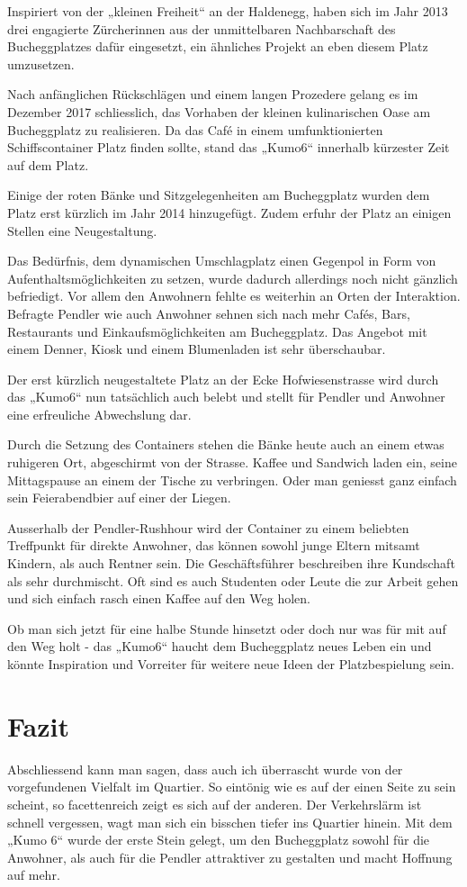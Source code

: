 \documentclass[a4paper,ngerman,11pt]{scrartcl}
\begin{document}
Inspiriert von der „kleinen Freiheit“ an der Haldenegg, haben sich im Jahr 2013
drei engagierte Zürcherinnen aus der unmittelbaren Nachbarschaft des
Bucheggplatzes dafür eingesetzt, ein ähnliches Projekt an eben diesem Platz
umzusetzen.

Nach anfänglichen Rückschlägen und einem langen Prozedere gelang es im Dezember
2017 schliesslich, das Vorhaben der kleinen kulinarischen Oase am Bucheggplatz
zu realisieren. Da das Café in einem umfunktionierten Schiffscontainer Platz
finden sollte, stand das „Kumo6“ innerhalb kürzester Zeit auf dem Platz.

Einige der roten Bänke und Sitzgelegenheiten am Bucheggplatz wurden dem Platz
erst kürzlich im Jahr 2014 hinzugefügt. Zudem erfuhr der Platz an einigen
Stellen eine Neugestaltung.

Das Bedürfnis, dem dynamischen Umschlagplatz einen Gegenpol in Form von
Aufenthaltsmöglichkeiten zu setzen, wurde dadurch allerdings noch nicht gänzlich
befriedigt. Vor allem den Anwohnern fehlte es weiterhin an Orten der
Interaktion. Befragte Pendler wie auch Anwohner sehnen sich nach mehr Cafés,
Bars, Restaurants und Einkaufsmöglichkeiten am Bucheggplatz. Das Angebot mit
einem Denner, Kiosk und einem Blumenladen ist sehr überschaubar.

Der erst kürzlich neugestaltete Platz an der Ecke Hofwiesenstrasse wird durch
das „Kumo6“ nun tatsächlich auch belebt und stellt für Pendler und Anwohner eine
erfreuliche Abwechslung dar.

Durch die Setzung des Containers stehen die Bänke heute auch an einem etwas
ruhigeren Ort, abgeschirmt von der Strasse. Kaffee und Sandwich laden ein, seine
Mittagspause an einem der Tische zu verbringen. Oder man geniesst ganz einfach
sein Feierabendbier auf einer der Liegen.

Ausserhalb der Pendler-Rushhour wird der Container zu einem beliebten Treffpunkt
für direkte Anwohner, das können sowohl junge Eltern mitsamt Kindern, als auch
Rentner sein. Die Geschäftsführer beschreiben ihre Kundschaft als sehr
durchmischt. Oft sind es auch Studenten oder Leute die zur Arbeit gehen und sich
einfach rasch einen Kaffee auf den Weg holen.

Ob man sich jetzt für eine halbe Stunde hinsetzt oder doch nur was für mit auf
den Weg holt - das „Kumo6“ haucht dem Bucheggplatz neues Leben ein und könnte
Inspiration und Vorreiter für weitere neue Ideen der Platzbespielung sein.

\section*{Fazit}

Abschliessend kann man sagen, dass auch ich überrascht wurde von der
vorgefundenen Vielfalt im Quartier. So eintönig wie es auf der einen Seite zu
sein scheint, so facettenreich zeigt es sich auf der anderen. Der Verkehrslärm
ist schnell vergessen, wagt man sich ein bisschen tiefer ins Quartier
hinein. Mit dem „Kumo 6“ wurde der erste Stein gelegt, um den Bucheggplatz
sowohl für die Anwohner, als auch für die Pendler attraktiver zu gestalten und
macht Hoffnung auf mehr.
\end{document}
